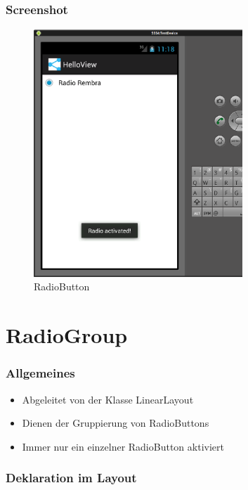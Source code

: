 \begin{frame}
   \frametitle{Screenshot}
	\begin{figure}[h!]
	  \centering
	  \includegraphics[width=0.7\textwidth]{pictures/radio_button.ps}
	  \caption{
		  RadioButton
	  }
	  \label{fig:radio_button}
	\end{figure}
\end{frame}

\section{RadioGroup}
\begin{frame}
   \frametitle{Allgemeines}
   \begin{itemize}
      \item Abgeleitet von der Klasse LinearLayout
      \item Dienen der Gruppierung von RadioButtons
      \item Immer nur ein einzelner RadioButton aktiviert
   \end{itemize}
\end{frame}

\begin{frame}
   \frametitle{Deklaration im Layout}
	
\end{frame}

